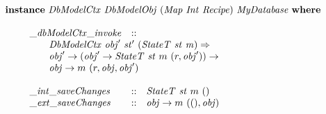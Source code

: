 \begin{displaymath}
\begin{array}{l}
\mathbf{instance}~\mathit{DbModelCtx}~\mathit{DbModelObj}~(\mathit{Map}~\mathit{Int}~\mathit{Recipe})~\mathit{MyDatabase}~\mathbf{where}\\\\
\qquad \begin{array}{lcl}
\mathit{\_\mathit{dbModelCtx\_invoke}} & :: & \\
\multicolumn{3}{l}{\qquad \mathit{DbModelCtx}~\mathit{obj}'~\mathit{st}'~(\mathit{StateT}~\mathit{st}~\mathit{m}) \Rightarrow}\\
\multicolumn{3}{l}{\qquad \mathit{obj}' \to (\mathit{obj}' \to \mathit{StateT}~\mathit{st}~m~(r,\mathit{obj}')) \to} \\
\multicolumn{3}{l}{\qquad \mathit{obj} \to m~(r,\mathit{obj},\mathit{obj}')} \\\\
\mathit{\_int\_saveChanges} & :: & \mathit{StateT}~\mathit{st}~m~\mathit{()} \\
\mathit{\_ext\_saveChanges} & :: & \mathit{obj} \to m~(\mathit{()}, \mathit{obj})
\end{array}
\end{array}
\end{displaymath}


